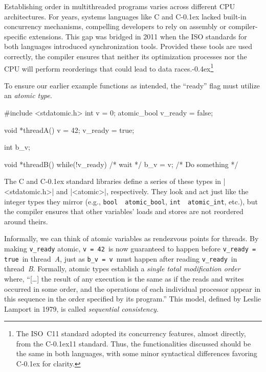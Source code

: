 \documentclass[fontsize=10pt, oneside]{scrartcl}
\newcommand{\punckern}{\kern-0.4ex}
\newcommand{\monobox}[1]{\mbox{\texttt{#1}}}
\newcommand{\cplusplus}[1]{C\kern-0.1ex\raisebox{0.15ex}{\texttt{++}}#1}
\newcommand{\clang}[1]{C#1}
\newcommand{\introduce}[1]{\textit{#1}}
\begin{document}
Establishing order in multithreaded programs varies across different \textsc{CPU} architectures.
For years, systems languages like \clang{} and \cplusplus{} lacked built-in concurrency mechanisms,
compelling developers to rely on assembly or compiler-specific extensions.
This gap was bridged in 2011 when the \textsc{ISO} standards for both languages introduced synchronization tools.
Provided these tools are used correctly,
the compiler ensures that neither its optimization processes nor the \textsc{CPU} will perform reorderings that could lead to data races.\punckern\footnote{%
The ISO~\clang{11} standard adopted its concurrency features,
almost directly, from the \cplusplus{11} standard.
Thus, the functionalities discussed should be the same in both languages,
with some minor syntactical differences favoring \cplusplus{} for clarity.
}

To ensure our earlier example functions as intended,
the ``ready'' flag must utilize an \introduce{atomic type}.
\begin{ccode}
#include <stdatomic.h>
int v = 0;
atomic_bool v_ready = false;

void *threadA()
{
    v = 42;
    v_ready = true;
}
\end{ccode}
\begin{ccode}
int b_v;

void *threadB()
{
    while(!v_ready) { /* wait */ }
    b_v = v;
    /* Do something */
}
\end{ccode}
The \clang{} and \cplusplus{} standard libraries define a series of these types in \cc|<stdatomic.h>| and \cpp|<atomic>|,
respectively.
They look and act just like the integer types they mirror (e.g., \monobox{bool}~\textrightarrow~\monobox{atomic\_bool},
\monobox{int}~\textrightarrow~\monobox{atomic\_int}, etc.),
but the compiler ensures that other variables' loads and stores are not reordered around theirs.

Informally, we can think of atomic variables as rendezvous points for threads.
By making \monobox{v\_ready} atomic,
\monobox{v = 42}\, is now guaranteed to happen before \monobox{v\_ready = true}\, in thread~\textit{A},
just as \monobox{b\_v = v}\, must happen after reading \monobox{v\_ready}\,
in thread~\textit{B}.
Formally, atomic types establish a \textit{single total modification order} where,
``[\ldots] the result of any execution is the same as if the reads and writes occurred in some order, and the operations of each individual processor appear in this sequence in the order specified by its program.''
This model, defined by Leslie Lamport in 1979,
is called \introduce{sequential consistency}.
\end{document}
